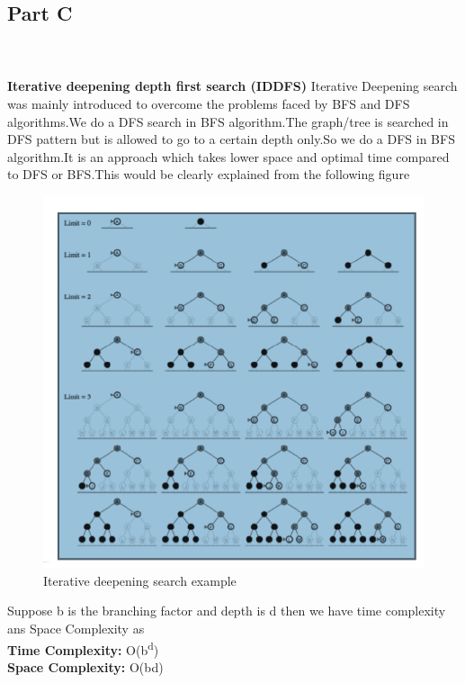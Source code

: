 \documentclass[conference]{IEEEtran}
\begin{document}
\subsection{Part C}
\\
\\
\textbf{Iterative deepening depth first search (IDDFS)} Iterative Deepening search was mainly introduced to overcome the problems faced by BFS and DFS algorithms.We do a DFS search in BFS algorithm.The graph/tree is searched in DFS pattern but is allowed to go to a certain depth only.So we do a DFS in BFS algorithm.It is an approach which takes lower space and  optimal time compared to DFS or BFS.This would be clearly explained from the following figure\cite{b1}
\begin{figure}[htbp]
\centerline{\includegraphics[scale=0.7]{itr.png}}
\caption{Iterative deepening search example\cite{}}
\label{fig}
\end{figure}
Suppose b is the branching factor and depth is d then we have time complexity ans Space Complexity as
\\
\textbf{Time Complexity:} O(b\textsuperscript{d})
\\
\textbf{Space Complexity:} O(bd)
\\
\end{document}
